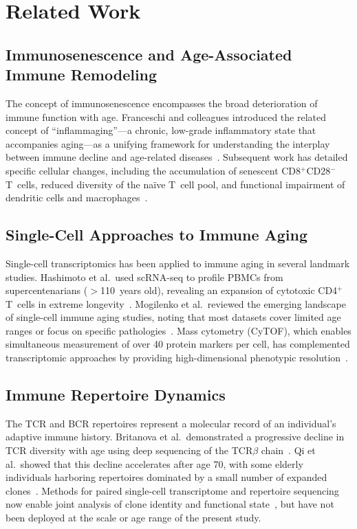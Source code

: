 \documentclass[11pt]{article}
\begin{document}
\section{Related Work}

\subsection{Immunosenescence and Age-Associated Immune Remodeling}

The concept of immunosenescence encompasses the broad deterioration of immune function with age. Franceschi and colleagues introduced the related concept of ``inflammaging''---a chronic, low-grade inflammatory state that accompanies aging---as a unifying framework for understanding the interplay between immune decline and age-related diseases~\citep{franceschi2000inflammaging}. Subsequent work has detailed specific cellular changes, including the accumulation of senescent CD8$^+$CD28$^-$ T~cells, reduced diversity of the na\"ive T~cell pool, and functional impairment of dendritic cells and macrophages~\citep{goronzy2013understanding,nikolich2014aging}.

\subsection{Single-Cell Approaches to Immune Aging}

Single-cell transcriptomics has been applied to immune aging in several landmark studies. Hashimoto et al.\ used scRNA-seq to profile PBMCs from supercentenarians ($>$110~years old), revealing an expansion of cytotoxic CD4$^+$ T~cells in extreme longevity~\citep{hashimoto2019single}. Mogilenko et al.\ reviewed the emerging landscape of single-cell immune aging studies, noting that most datasets cover limited age ranges or focus on specific pathologies~\citep{mogilenko2021immune}. Mass cytometry (CyTOF), which enables simultaneous measurement of over 40 protein markers per cell, has complemented transcriptomic approaches by providing high-dimensional phenotypic resolution~\citep{bendall2011single,stoeckius2017simultaneous}.

\subsection{Immune Repertoire Dynamics}

The TCR and BCR repertoires represent a molecular record of an individual's adaptive immune history. Britanova et al.\ demonstrated a progressive decline in TCR diversity with age using deep sequencing of the TCR$\beta$ chain~\citep{britanova2014age}. Qi et al.\ showed that this decline accelerates after age 70, with some elderly individuals harboring repertoires dominated by a small number of expanded clones~\citep{qi2014diversity}. Methods for paired single-cell transcriptome and repertoire sequencing now enable joint analysis of clone identity and functional state~\citep{stubbington2017tcell,de2018clonotypes}, but have not been deployed at the scale or age range of the present study.
\end{document}
